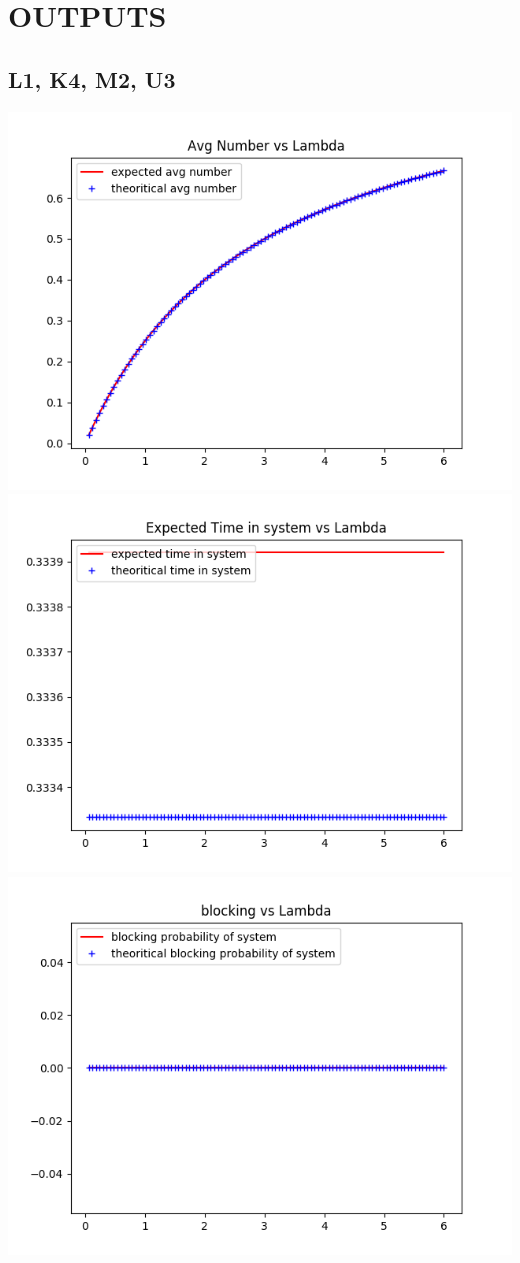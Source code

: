 \documentclass[11pt]{article}
\begin{document}
 \section{OUTPUTS}
 \subsection{L1, K4, M2, U3}
 \includegraphics{ExpectedNumber_L1_K4_M2_U3}
  \includegraphics{ExpectedTime_L1_K4_M2_U3}
 \includegraphics{BlockingProbability_L1_K4_M2_U3}
\end{document}
